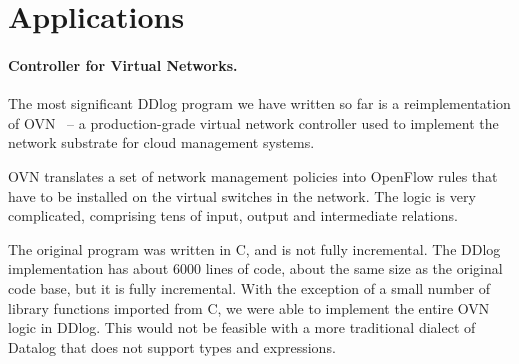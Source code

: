 \section{Applications}\label{sec:applications}

\paragraph{Controller for Virtual Networks.}

The most significant DDlog program we have written so far is a
reimplementation of OVN~\cite{ovn} -- a production-grade
virtual network controller used to implement the network substrate
for cloud management systems.

OVN translates a set of network management policies into OpenFlow
rules that have to be installed on the virtual switches in the
network.  The logic is very complicated, comprising tens of input,
output and intermediate relations.

The original program was written in C, and is not fully incremental.
The DDlog implementation has about 6000 lines of code, about the same
size as the original code base, but it is fully incremental.
With the exception of a small number of library functions imported
from C, we were able to implement the entire OVN logic in DDlog.
This would not be feasible with a more traditional dialect of Datalog
that does not support types and expressions.





